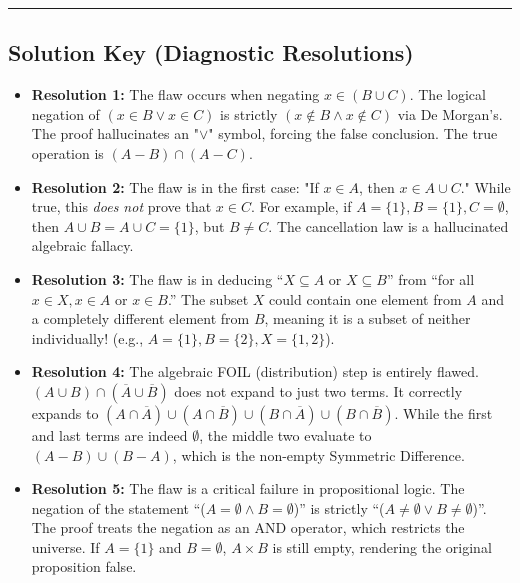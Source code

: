 \documentclass[11pt]{article}
\theoremstyle{definition}
\begin{document}
\vspace{0.5cm}
\hrule
\vspace{0.5cm}

\subsection{Solution Key (Diagnostic Resolutions)}
\begin{itemize}
    \item \textbf{Resolution 1:} The flaw occurs when negating $x \in (B \cup C)$. The logical negation of $(x \in B \lor x \in C)$ is strictly $(x \notin B \land x \notin C)$ via De Morgan's. The proof hallucinates an "$\lor$" symbol, forcing the false conclusion. The true operation is $(A - B) \cap (A - C)$.
    \item \textbf{Resolution 2:} The flaw is in the first case: "If $x \in A$, then $x \in A \cup C$." While true, this \textit{does not} prove that $x \in C$. For example, if $A = \{1\}, B = \{1\}, C = \emptyset$, then $A \cup B = A \cup C = \{1\}$, but $B \neq C$. The cancellation law is a hallucinated algebraic fallacy.
    \item \textbf{Resolution 3:} The flaw is in deducing ``$X \subseteq A$ or $X \subseteq B$'' from ``for all $x \in X, x \in A$ or $x \in B$.'' The subset $X$ could contain one element from $A$ and a completely different element from $B$, meaning it is a subset of neither individually! (e.g., $A=\{1\}, B=\{2\}, X=\{1,2\}$). 
    \item \textbf{Resolution 4:} The algebraic FOIL (distribution) step is entirely flawed. $(A \cup B) \cap (\overline{A} \cup \overline{B})$ does not expand to just two terms. It correctly expands to $(A \cap \overline{A}) \cup (A \cap \overline{B}) \cup (B \cap \overline{A}) \cup (B \cap \overline{B})$. While the first and last terms are indeed $\emptyset$, the middle two evaluate to $(A - B) \cup (B - A)$, which is the non-empty Symmetric Difference.
    \item \textbf{Resolution 5:} The flaw is a critical failure in propositional logic. The negation of the statement ``($A = \emptyset \land B = \emptyset$)'' is strictly ``($A \neq \emptyset \lor B \neq \emptyset$)''. The proof treats the negation as an AND operator, which restricts the universe. If $A=\{1\}$ and $B=\emptyset$, $A \times B$ is still empty, rendering the original proposition false. 
\end{itemize}
\end{document}
